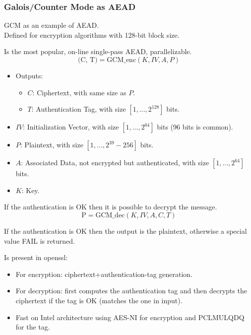 \clearpage

\subsubsection{Galois/Counter Mode as AEAD}
\begin{center}
    GCM as an example of AEAD. \\ Defined for encryption algorithms with 128-bit block size.
\end{center}
Is the most popular, on-line single-pass AEAD, parallelizable.
\[
    \text{(C, T)} = \text{GCM\_enc}(K, IV, A, P)
\]
\begin{itemize}
    \item Outputs:
    \begin{itemize}
        \item $C$: Ciphertext, with same size as $P$.
        \item $T$: Authentication Tag, with size $[1, ..., 2^{128}]$ bits.
    \end{itemize}
    \item $IV$: Initialization Vector, with size $[1, ..., 2^{64}]$ bits (96 bits is common).
    \item $P$: Plaintext, with size $[1, ..., 2^{39}-256]$ bits.
    \item $A$: Associated Data, not encrypted but authenticated, with size $[1, ..., 2^{64}]$ bits.
    \item $K$: Key.
\end{itemize}

If the authentication is OK then it is possible to decrypt the message.
\[
    \text{P} = \text{GCM\_dec}(K, IV, A, C, T)
\]
\begin{tcolorbox}[colback=blue!10!white, colframe=blue!50!white, title=Output of decryption]
    If the authentication is OK then the output is the plaintext, otherwise a special value FAIL is returned.
\end{tcolorbox}
Is present in openssl:
\begin{itemize}
    \item For encryption: ciphertext+authentication-tag generation.
    \item For decryption: first computes the authentication tag and then decrypts the ciphertext if the tag is OK (matches the one in input).
    \item Fast on Intel architecture using AES-NI for encryption and PCLMULQDQ for the tag.
\end{itemize}

